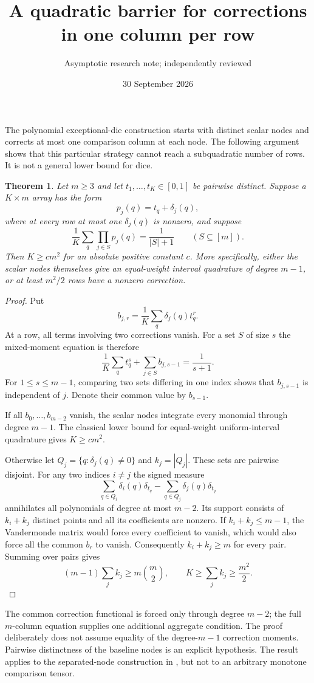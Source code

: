 \documentclass[11pt]{article}
\title{A quadratic barrier for corrections in one column per row}
\author{Asymptotic research note; independently reviewed}
\date{30 September 2026}
\newtheorem{theorem}{Theorem}
\begin{document}
\maketitle
The polynomial exceptional-die construction starts with distinct scalar
nodes and corrects at most one comparison column at each node. The
following argument shows that this particular strategy cannot reach a
subquadratic number of rows. It is not a general lower bound for dice.

\begin{theorem}
Let $m\ge3$ and let $t_1,\ldots,t_K\in[0,1]$ be pairwise distinct.
Suppose a $K\times m$ array has the form
\[
 p_j(q)=t_q+\delta_j(q),
\]
where at every row at most one $\delta_j(q)$ is nonzero, and suppose
\[
 \frac1K\sum_q\prod_{j\in S}p_j(q)=\frac1{|S|+1}
 \qquad(S\subseteq[m]).
\]
Then $K\ge c m^2$ for an absolute positive constant $c$.
More specifically, either the scalar nodes themselves give an
equal-weight interval quadrature of degree $m-1$, or at least
$m^2/2$ rows have a nonzero correction.
\end{theorem}
\begin{proof}
Put
\[
 b_{j,r}=\frac1K\sum_q\delta_j(q)t_q^r.
\]
At a row, all terms involving two corrections vanish. For a set $S$
of size $s$ the mixed-moment equation is therefore
\[
 \frac1K\sum_q t_q^s+\sum_{j\in S}b_{j,s-1}=\frac1{s+1}.
\]
For $1\le s\le m-1$, comparing two sets differing in one index shows
that $b_{j,s-1}$ is independent of $j$. Denote their common value by
$b_{s-1}$.

If all $b_0,\ldots,b_{m-2}$ vanish, the scalar nodes integrate every
monomial through degree $m-1$. The classical lower bound for equal-weight
uniform-interval quadrature gives $K\ge c m^2$.

Otherwise let $Q_j=\{q:\delta_j(q)\ne0\}$ and $k_j=|Q_j|$.
These sets are pairwise disjoint. For any two indices $i\ne j$ the
signed measure
\[
 \sum_{q\in Q_i}\delta_i(q)\delta_{t_q}
 -\sum_{q\in Q_j}\delta_j(q)\delta_{t_q}
\]
annihilates all polynomials of degree at most $m-2$.
Its support consists of $k_i+k_j$ distinct points and all its
coefficients are nonzero. If $k_i+k_j\le m-1$, the Vandermonde matrix
would force every coefficient to vanish, which would also force all
the common $b_r$ to vanish. Consequently $k_i+k_j\ge m$ for every
pair. Summing over pairs gives
\[
 (m-1)\sum_j k_j\ge m\binom m2,
 \qquad K\ge\sum_jk_j\ge\frac{m^2}{2}.
\]
\end{proof}

The common correction functional is forced only through degree $m-2$;
the full $m$-column equation supplies one additional aggregate condition.
The proof deliberately does not assume equality of the degree-$m-1$
correction moments. Pairwise distinctness of the baseline nodes is an
explicit hypothesis. The result applies to the separated-node construction
in , but not to an
arbitrary monotone comparison tensor.
\end{document}
